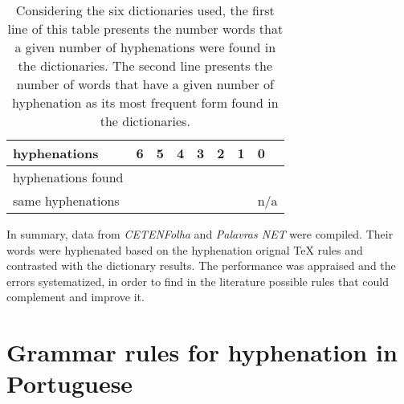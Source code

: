 \documentclass{article}
\begin{document}
\begin{table}
\centering
\caption{Considering the six dictionaries used, the first line of this table
presents the number words that a given number of hyphenations were found in the
dictionaries. The second line presents the number of words that have a given
number of hyphenation as its most frequent form found in the
dictionaries.}\label{tblstats}
\small
\begin{tabular}{*{8}{l}}
    hyphenations & 6 & 5 & 4 & 3 & 2 & 1 & 0 \\
    \hline
    hyphenations found & \NumberOfSixHyphens{} & \NumberOfFiveHyphens{} &
    \NumberOfFourHyphen{} & \NumberOfThreeHyphens{} & \NumberOfTwoHyphens{} &
    \NumberOfOneHyphens{} & \NumberOfNoHyphens{} \\

    same hyphenations & \NumberOfSixAgrees{} & \NumberOfFiveAgrees{} &
    \NumberOfFourAgrees{} & \NumberOfThreeAgrees{} & \NumberOfTwoAgrees{} &
    \NumberOfOneAgrees{} & n/a
\end{tabular}
\end{table}

In summary, data from \emph{CETENFolha} and \emph{Palavras NET} were compiled.
Their words were hyphenated based on the hyphenation orignal \TeX{} rules and
contrasted with the dictionary results. The performance was appraised and the
errors systematized, in order to find in the literature possible rules that
could complement and improve it.



\section{Grammar rules for hyphenation in Portuguese} 
\end{document}
